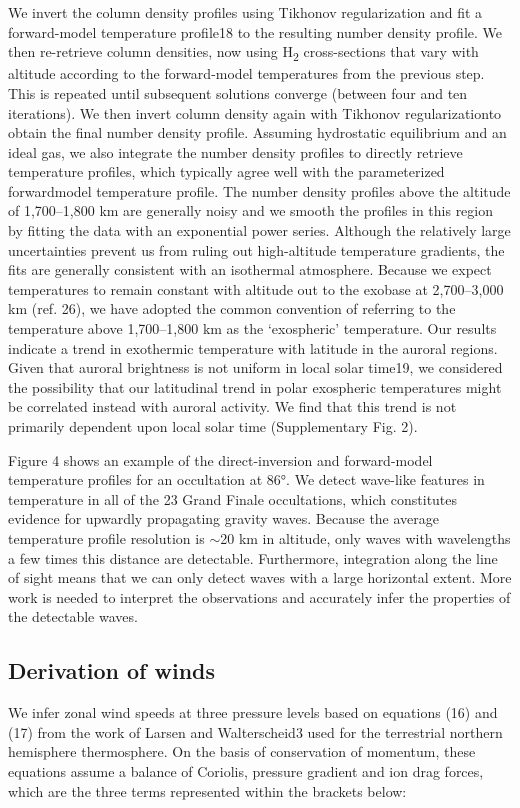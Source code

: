 We invert the column density profiles using Tikhonov regularization and fit a forward-model temperature profile18 to the resulting number density profile. We then re-retrieve column densities, now using H\textsubscript{2} cross-sections that vary with altitude according to the forward-model temperatures from the previous step. This is repeated until subsequent solutions converge (between four and ten iterations). We then invert column density again with Tikhonov regularizationto obtain the final number density profile. Assuming hydrostatic equilibrium and an ideal gas, we also integrate the number density profiles to directly retrieve temperature profiles, which typically agree well with the parameterized forwardmodel temperature profile. The number density profiles above the altitude of 1,700–1,800 km are generally noisy and we smooth the profiles in this region by fitting the data with an exponential power series. Although the relatively large uncertainties prevent us from ruling out high-altitude temperature gradients, the fits are generally consistent with an isothermal atmosphere. Because we expect temperatures to remain constant with altitude out to the exobase at 2,700–3,000 km (ref. 26), we have adopted the common convention of referring to the temperature above 1,700–1,800 km as the ‘exospheric’ temperature. Our results indicate a trend in exothermic temperature with latitude in the auroral regions. Given that auroral brightness is not uniform in local solar time19, we considered the possibility that our latitudinal trend in polar exospheric temperatures might be correlated instead with auroral activity. We find that this trend is not primarily dependent upon local solar time (Supplementary Fig. 2).

Figure 4 shows an example of the direct-inversion and forward-model temperature profiles for an occultation at 86°. We detect wave-like features in temperature in all of the 23 Grand Finale occultations, which constitutes evidence for upwardly propagating gravity waves. Because the average temperature profile resolution is $\sim$20 km in altitude, only waves with wavelengths a few times this distance are detectable. Furthermore, integration along the line of sight means that we can only detect waves with a large horizontal extent. More work is needed to interpret the observations and accurately infer the properties of the detectable waves.

\subsection{Derivation of winds}
We infer zonal wind speeds at three pressure levels based on equations (16) and (17) from the work of Larsen and Walterscheid3 used for the terrestrial northern hemisphere thermosphere. On the basis of conservation of momentum, these equations assume a balance of Coriolis, pressure gradient and ion drag forces, which are the three terms represented within the brackets below:

